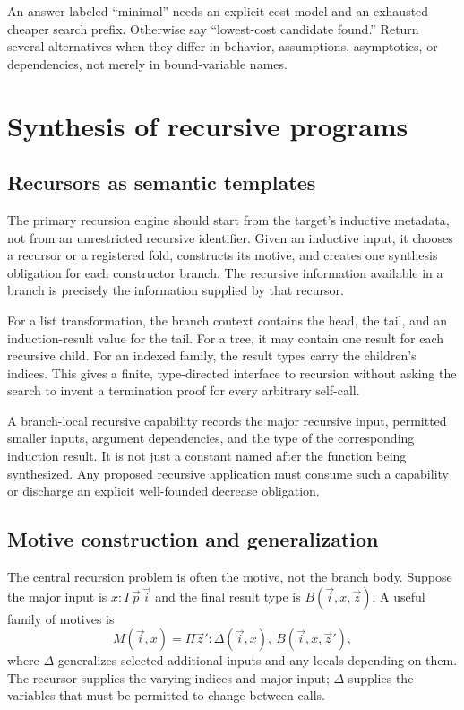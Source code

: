 \documentclass[11pt,a4paper]{article}
\theoremstyle{remark}
\begin{document}
An answer labeled ``minimal'' needs an explicit cost model and an exhausted cheaper search prefix. Otherwise say ``lowest-cost candidate found.'' Return several alternatives when they differ in behavior, assumptions, asymptotics, or dependencies, not merely in bound-variable names.

\section{Synthesis of recursive programs}\label{sec:recursion}

\subsection{Recursors as semantic templates}

The primary recursion engine should start from the target's inductive metadata, not from an unrestricted recursive identifier. Given an inductive input, it chooses a recursor or a registered fold, constructs its motive, and creates one synthesis obligation for each constructor branch. The recursive information available in a branch is precisely the information supplied by that recursor.

For a list transformation, the branch context contains the head, the tail, and an induction-result value for the tail. For a tree, it may contain one result for each recursive child. For an indexed family, the result types carry the children's indices. This gives a finite, type-directed interface to recursion without asking the search to invent a termination proof for every arbitrary self-call.

A branch-local recursive capability records the major recursive input, permitted smaller inputs, argument dependencies, and the type of the corresponding induction result. It is not just a constant named after the function being synthesized. Any proposed recursive application must consume such a capability or discharge an explicit well-founded decrease obligation.

\subsection{Motive construction and generalization}

The central recursion problem is often the motive, not the branch body. Suppose the major input is $x:I\,\vec p\,\vec i$ and the final result type is $B(\vec i,x,\vec z)$. A useful family of motives is
\[
 M(\vec i,x)=\Pi\vec z':\Delta(\vec i,x),\ B(\vec i,x,\vec z'),
\]
where $\Delta$ generalizes selected additional inputs and any locals depending on them. The recursor supplies the varying indices and major input; $\Delta$ supplies the variables that must be permitted to change between calls.
\end{document}
